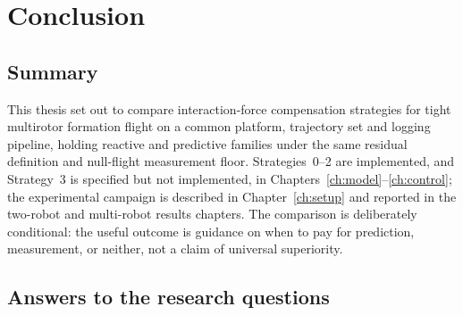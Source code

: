 %
%
%

\chapter{Conclusion}
\label{ch:conclusion}

\section{Summary}
\label{sec:conclusion-summary}

This thesis set out to compare interaction-force compensation strategies for tight multirotor
formation flight on a common platform, trajectory set and logging pipeline, holding reactive and
predictive families under the same residual definition and null-flight measurement floor. Strategies~0--2
are implemented, and Strategy~3 is specified but not implemented, in Chapters~\ref{ch:model}--\ref{ch:control}; the experimental
campaign is described in Chapter~\ref{ch:setup} and reported in the two-robot and
multi-robot results chapters. The comparison is deliberately conditional: the useful outcome is guidance
on when to pay for prediction, measurement, or neither, not a claim of universal superiority.

\section{Answers to the research questions}
\label{sec:conclusion-rq}

